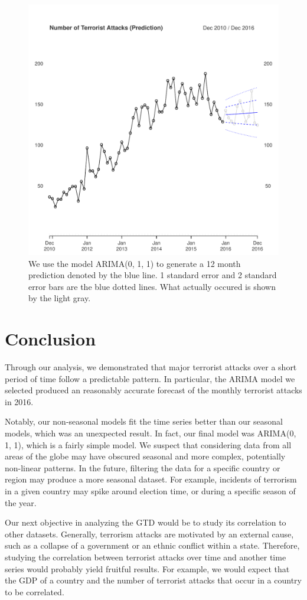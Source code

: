 \documentclass[11pt]{paper}
\begin{document}
\begin{figure}
\centering
\includegraphics[width=0.75\linewidth]{../image/prediction_on_testing.pdf}
\caption{We use the model ARIMA(0, 1, 1) to generate a 12 month prediction denoted by the blue line. 1 standard error and 2 standard error bars are the blue dotted lines. What actually occured is shown by the light gray.}
\label{prediction}
\end{figure}


\section{Conclusion}
Through our analysis, we demonstrated that major terrorist attacks over a short period of time follow a predictable pattern. In particular, the ARIMA model we selected produced an reasonably accurate forecast of the monthly terrorist attacks in 2016.

Notably, our non-seasonal models fit the time series better than our seasonal models, which was an unexpected result. In fact, our final model was ARIMA(0, 1, 1), which is a fairly simple model. We suspect that considering data from all areas of the globe may have obscured seasonal and more complex, potentially non-linear patterns. In the future, filtering the data for a specific country or region may produce a more seasonal dataset. For example, incidents of terrorism in a given country may spike around election time, or during a specific season of the year.

Our next objective in analyzing the GTD would be to study its correlation to other datasets. Generally, terrorism attacks are motivated by an external cause, such as a collapse of a government or an ethnic conflict within a state. Therefore, studying the correlation between terrorist attacks over time and another time series would probably yield fruitful results. For example, we would expect that the GDP of a country and the number of terrorist attacks that occur in a country to be correlated.
\end{document}
